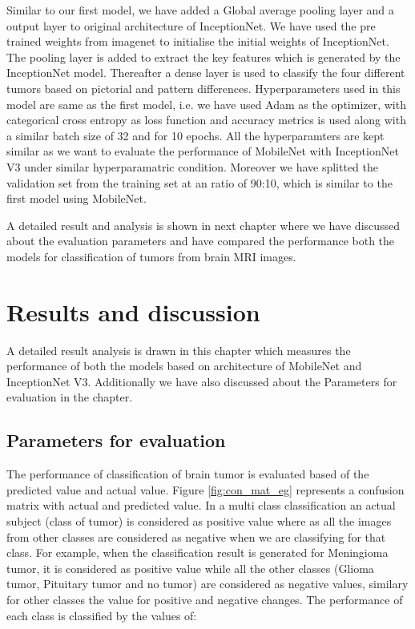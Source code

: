 \documentclass[12pt, a4paper,twoside]{report}
\theoremstyle{plain} %
\theoremstyle{definition} %
\theoremstyle{remark} %
\numberwithin{equation}{chapter}
\begin{document}
Similar to our first model, we have added a Global average pooling layer and a  output layer to original architecture of InceptionNet. We have used the pre trained weights from imagenet to initialise the initial weights of InceptionNet. The pooling layer is added to extract the key features which is generated by the InceptionNet model. Thereafter a dense layer is used to classify the four different tumors based on pictorial and pattern differences. Hyperparameters used in this model are same as the first model, i.e. we have used Adam as the optimizer, with categorical cross entropy as loss function and accuracy metrics is used along with a similar batch size of 32 and for 10 epochs. All the hyperparamters are kept similar as we want to evaluate the performance of MobileNet with InceptionNet V3 under similar hyperparamatric condition. Moreover we have splitted the validation set from the training set at an ratio of 90:10, which is similar to the first model using MobileNet.


A detailed result and analysis is shown in next chapter where we have discussed about the evaluation parameters and have compared the performance both the models for classification of tumors from brain MRI images.

\chapter{Results and discussion}\label{ch:4}
A detailed result analysis is drawn in this chapter which measures the performance of both the models based on architecture of MobileNet and InceptionNet V3. Additionally we have also discussed about the Parameters for evaluation in the chapter. 

\section{Parameters for evaluation}\label{sec:4.2}
The performance of classification of brain tumor is evaluated based of the predicted value and actual value. Figure \ref{fig:con_mat_eg} represents a confusion matrix with actual and predicted value. In a multi class classification an actual subject (class of tumor) is considered as positive value where as all the images from other classes are considered as negative when we are classifying for that class. For example, when the classification result is generated for Meningioma tumor, it is considered as positive value while all the other classes (Glioma tumor, Pituitary tumor and no tumor) are considered as negative values, similary for other classes the value for positive and negative changes. The performance of each class is classified by the values of: 
\end{document}
